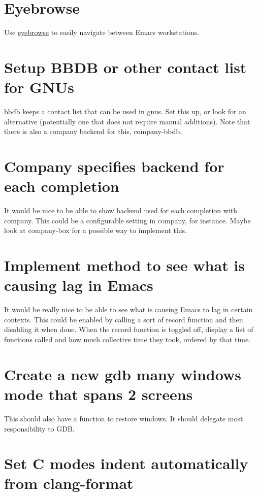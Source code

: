 \documentclass{default}
\begin{document}
\section{Eyebrowse}

Use \href{https://github.com/wasamasa/eyebrowse}{eyebrowse} to easily navigate between Emacs workstations.

\section{Setup BBDB or other contact list for GNUs}

bbdb keeps a contact list that can be used in gnus. Set this up, or look for an alternative
(potentially one that does not require manual additions). Note that there is also a company backend
for this, company-bbdb.

\section{Company specifies backend for each completion}

It would be nice to be able to show backend used for each completion with company. This could be a
configurable setting in company, for instance. Maybe look at company-box for a possible way to
implement this.

\section{Implement method to see what is causing lag in Emacs}

It would be really nice to be able to see what is causing Emacs to lag in certain contexts. This
could be enabled by calling a sort of record function and then disabling it when done. When the
record function is toggled off, display a list of functions called and how much collective time they
took, ordered by that time.

\section{Create a new gdb many windows mode that spans 2 screens}

This should also have a function to restore windows. It should delegate most responsibility to GDB\@.

\section{Set C modes indent automatically from clang-format}
\end{document}
